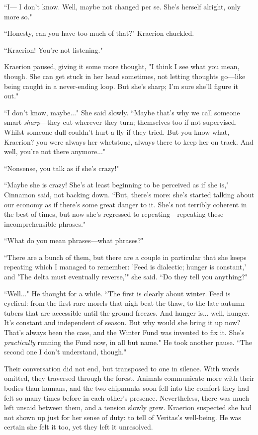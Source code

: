 ``I--- I don't know. Well, maybe not changed per se.
She's herself alright, only more so."

``Honesty, can you have too much of that?" Kraerion chuckled.

``Kraerion!
You're not listening."

Kraerion paused, giving it some more thought, "I think I see what you mean, though.
She can get stuck in her head sometimes, not letting thoughts go---like being caught in a never-ending loop.
But she's sharp; I'm sure she'll figure it out."

``I don't know, maybe..." She said slowly. ``Maybe that's why we call someone smart \textit{sharp}---they cut wherever they turn; themselves too if not supervised.
Whilst someone dull couldn't hurt a fly if they tried.
But you know what, Kraerion? you were always her whetstone, always there to keep her on track.
And well, you're not there anymore..."

``Nonsense, you talk as if she's crazy!"

``Maybe she is crazy! She's at least beginning to be perceived as if she is," Cinnamon said, not backing down.
``But, there's more: she's started talking about our economy as if there's some great danger to it.
She's not terribly coherent in the best of times, but now she's regressed to repeating---repeating these incomprehensible phrases."

``What do you mean phrases---what phrases?"

``There are a bunch of them, but there are a couple in particular that she keeps repeating which I managed to remember: 'Feed is dialectic; hunger is constant,' and 'The delta must eventually reverse,'" she said. ``Do they tell you anything?"

``Well..." He thought for a while. ``The first is clearly about winter. Feed is cyclical: from the first rare morels that nigh beat the thaw, to the late autumn tubers that are accessible until the ground freezes.
And hunger is... well, hunger.
It's constant and independent of season.
But why would she bring it up now?
That's always been the case, and the Winter Fund was invented to fix it.
She's \textit{practically} running the Fund now, in all but name." He took another pause.
``The second one I don't understand, though."

Their conversation did not end, but transposed to one in silence.
With words omitted, they traversed through the forest.
Animals communicate more with their bodies than humans, and the two chipmunks soon fell into the comfort they had felt so many times before in each other's presence.
Nevertheless, there was much left unsaid between them, and a tension slowly grew.
Kraerion suspected she had not shown up just for her sense of duty: to tell of Veritas's well-being.
He was certain she felt it too, yet they left it unresolved.


